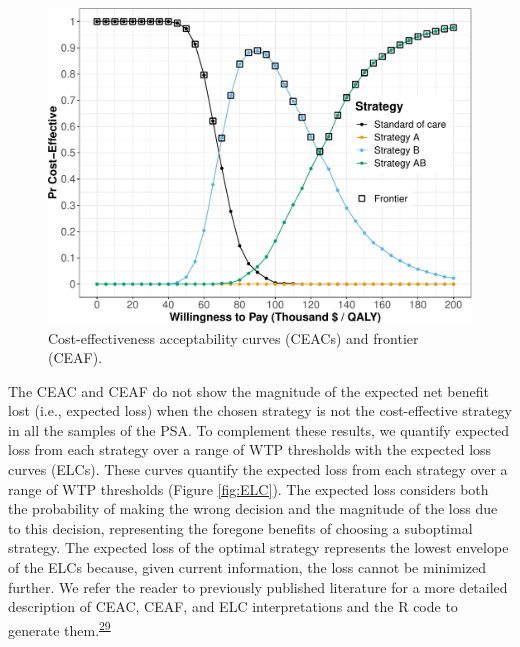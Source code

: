 \documentclass[
]{article}
\begin{document}
\begin{figure}[H]

{\centering \includegraphics{figs/CEAC-1} 

}

\caption{Cost-effectiveness acceptability curves (CEACs) and frontier (CEAF).}\label{fig:CEAC}
\end{figure}

The CEAC and CEAF do not show the magnitude of the expected net benefit lost (i.e., expected loss) when the chosen strategy is not the cost-effective strategy in all the samples of the PSA. To complement these results, we quantify expected loss from each strategy over a range of WTP thresholds with the expected loss curves (ELCs). These curves quantify the expected loss from each strategy over a range of WTP thresholds (Figure \ref{fig:ELC}). The expected loss considers both the probability of making the wrong decision and the magnitude of the loss due to this decision, representing the foregone benefits of choosing a suboptimal strategy. The expected loss of the optimal strategy represents the lowest envelope of the ELCs because, given current information, the loss cannot be minimized further. We refer the reader to previously published literature for a more detailed description of CEAC, CEAF, and ELC interpretations and the R code to generate them.\textsuperscript{\protect\hyperlink{ref-Alarid-Escudero2019}{29}}
\end{document}
